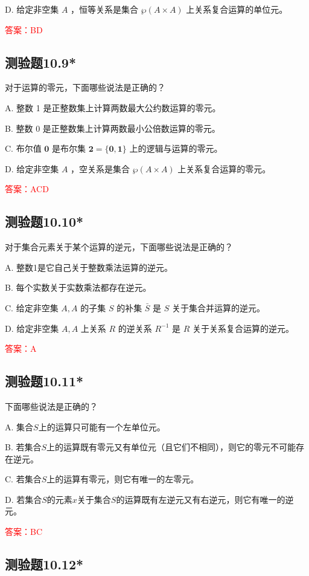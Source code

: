 \documentclass[UTF8, heading=true]{ctexart}
\begin{document}
D. 给定非空集 $A$ ，恒等关系是集合 $\wp(A \times A)$ 上关系复合运算的单位元。

\textcolor{red}{答案：BD}

\subsection{测验题10.9*}

对于运算的零元，下面哪些说法是正确的？

A. 整数 1 是正整数集上计算两数最大公约数运算的零元。

B. 整数 0 是正整数集上计算两数最小公倍数运算的零元。

C. 布尔值 $\mathbf{0}$ 是布尔集 $\mathbf{2}=\{\mathbf{0}, \mathbf{1}\}$ 上的逻辑与运算的零元。

D. 给定非空集 $A$ ，空关系是集合 $\wp(A \times A)$ 上关系复合运算的零元。

\textcolor{red}{答案：ACD}

\subsection{测验题10.10*}


对于集合元素关于某个运算的逆元，下面哪些说法是正确的？

A. 整数1是它自己关于整数乘法运算的逆元。

B. 每个实数关于实数乘法都存在逆元。

C. 给定非空集 $A, A$ 的子集 $S$ 的补集 $\bar{S}$ 是 $S$ 关于集合并运算的逆元。

D. 给定非空集 $A, A$ 上关系 $R$ 的逆关系 $R^{-1}$ 是 $R$ 关于关系复合运算的逆元。

\textcolor{red}{答案：A}

\subsection{测验题10.11*}

下面哪些说法是正确的？

A. 集合$S$上的运算只可能有一个左单位元。

B. 
若集合$S$上的运算既有零元又有单位元（且它们不相同），则它的零元不可能存在逆元。

C. 若集合$S$上的运算有零元，则它有唯一的左零元。

D. 若集合$S$的元素$x$关于集合$S$的运算既有左逆元又有右逆元，则它有唯一的逆元。

\textcolor{red}{答案：BC}


\subsection{测验题10.12*}
\end{document}
